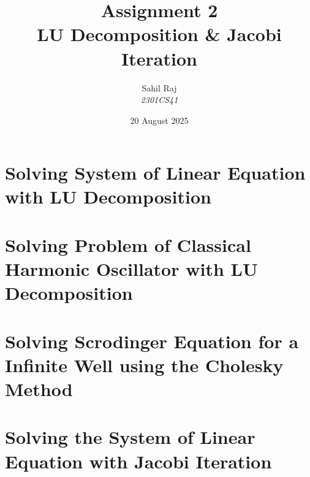 \documentclass[12pt,a4paper]{report}
\title{\textbf{Assignment 2}\\LU Decomposition \& Jacobi Iteration}
\author{Sahil Raj\\\textit{2301CS41}}
\date{20 August 2025}
\begin{document}
\maketitle
\tableofcontents
\clearpage

\chapter{Solving System of Linear Equation with LU Decomposition}


\chapter{Solving Problem of Classical Harmonic Oscillator with LU Decomposition}


\chapter{Solving Scrodinger Equation for a Infinite Well using the Cholesky Method}


\chapter{Solving the System of Linear Equation with Jacobi Iteration}

\end{document}
